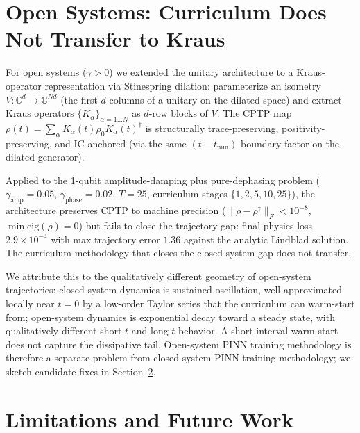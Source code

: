 \documentclass[11pt]{article}
\begin{document}
\section{Open Systems: Curriculum Does Not Transfer to Kraus}
\label{sec:openkraus}

For open systems ($\gamma > 0$) we extended the unitary architecture to a Kraus-operator representation via Stinespring dilation: parameterize an isometry $V: \mathbb{C}^d \to \mathbb{C}^{Nd}$ (the first $d$ columns of a unitary on the dilated space) and extract Kraus operators $\{K_\alpha\}_{\alpha = 1 \ldots N}$ as $d$-row blocks of $V$. The CPTP map $\rho(t) = \sum_\alpha K_\alpha(t) \rho_0 K_\alpha(t)^\dagger$ is structurally trace-preserving, positivity-preserving, and IC-anchored (via the same $(t - t_{\min})$ boundary factor on the dilated generator).

Applied to the 1-qubit amplitude-damping plus pure-dephasing problem ($\gamma_{\mathrm{amp}} = 0.05$, $\gamma_{\mathrm{phase}} = 0.02$, $T = 25$, curriculum stages $\{1, 2, 5, 10, 25\}$), the architecture preserves CPTP to machine precision ($\| \rho - \rho^\dagger \|_F < 10^{-8}$, $\min \mathrm{eig}(\rho) = 0$) but fails to close the trajectory gap: final physics loss $2.9 \times 10^{-4}$ with max trajectory error $1.36$ against the analytic Lindblad solution. The curriculum methodology that closes the closed-system gap does not transfer.

We attribute this to the qualitatively different geometry of open-system trajectories: closed-system dynamics is sustained oscillation, well-approximated locally near $t = 0$ by a low-order Taylor series that the curriculum can warm-start from; open-system dynamics is exponential decay toward a steady state, with qualitatively different short-$t$ and long-$t$ behavior. A short-interval warm start does not capture the dissipative tail. Open-system PINN training methodology is therefore a separate problem from closed-system PINN training methodology; we sketch candidate fixes in Section~\ref{sec:limitations}.

\section{Limitations and Future Work}
\label{sec:limitations}
\end{document}
